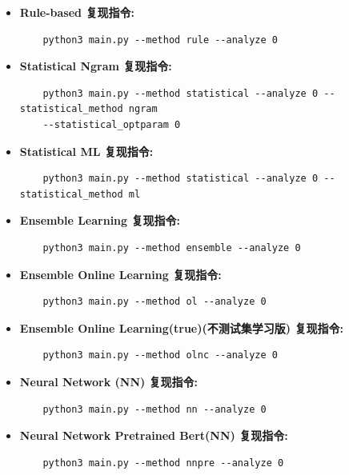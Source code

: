 \documentclass[answers]{exam}  %
\begin{document}
\begin{itemize}
    \item \textbf{Rule-based 复现指令:}
    \begin{lstlisting}
    python3 main.py --method rule --analyze 0  
    \end{lstlisting}

    \item \textbf{Statistical Ngram 复现指令:}
    \begin{lstlisting}
    python3 main.py --method statistical --analyze 0 --statistical_method ngram 
    --statistical_optparam 0
    \end{lstlisting}

    \item \textbf{Statistical ML 复现指令:}
    \begin{lstlisting}
    python3 main.py --method statistical --analyze 0 --statistical_method ml 
    \end{lstlisting}

    \item \textbf{Ensemble Learning 复现指令:}
    \begin{lstlisting}
    python3 main.py --method ensemble --analyze 0
    \end{lstlisting}

    \item \textbf{Ensemble Online Learning 复现指令:}
    \begin{lstlisting}
    python3 main.py --method ol --analyze 0
    \end{lstlisting}

    \item \textbf{Ensemble Online Learning(true)(不测试集学习版) 复现指令:}
    \begin{lstlisting}
    python3 main.py --method olnc --analyze 0
    \end{lstlisting}

    \item \textbf{Neural Network (NN) 复现指令:}
    \begin{lstlisting}
    python3 main.py --method nn --analyze 0 
    \end{lstlisting}


    \item \textbf{Neural Network Pretrained Bert(NN) 复现指令:}
    \begin{lstlisting}
    python3 main.py --method nnpre --analyze 0 
    \end{lstlisting}
\end{itemize}
\end{document}
